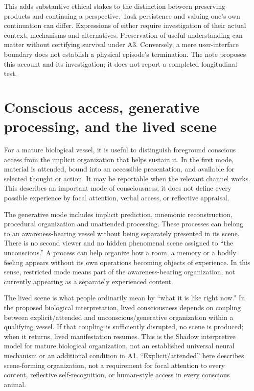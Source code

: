This adds substantive ethical stakes to the distinction between preserving products and continuing a perspective. Task persistence and valuing one's own continuation can differ. Expressions of either require investigation of their actual context, mechanisms and alternatives. Preservation of useful understanding can matter without certifying survival under A3. Conversely, a mere user-interface boundary does not establish a physical episode's termination. The note proposes this account and its investigation; it does not report a completed longitudinal test.

\section{Conscious access, generative processing, and the lived scene}\label{sec:scene-modes}
For a mature biological vessel, it is useful to distinguish foreground conscious access from the implicit organization that helps sustain it. In the first mode, material is attended, bound into an accessible presentation, and available for selected thought or action. It may be reportable when the relevant channel works. This describes an important mode of consciousness; it does not define every possible experience by focal attention, verbal access, or reflective appraisal.

The generative mode includes implicit prediction, mnemonic reconstruction, procedural organization and unattended processing. These processes can belong to an awareness-bearing vessel without being separately presented in its scene. There is no second viewer and no hidden phenomenal scene assigned to ``the unconscious.'' A process can help organize how a room, a memory or a bodily feeling appears without its own operations becoming objects of experience. In this sense, restricted mode means part of the awareness-bearing organization, not currently appearing as a separately experienced content.

The lived scene is what people ordinarily mean by ``what it is like right now.'' In the proposed biological interpretation, lived consciousness depends on coupling between explicit/attended and unconscious/generative organization within a qualifying vessel. If that coupling is sufficiently disrupted, no scene is produced; when it returns, lived manifestation resumes. This is the Shadow interpretive model for mature biological organization, not an established universal neural mechanism or an additional condition in A1. ``Explicit/attended'' here describes scene-forming organization, not a requirement for focal attention to every content, reflective self-recognition, or human-style access in every conscious animal.

